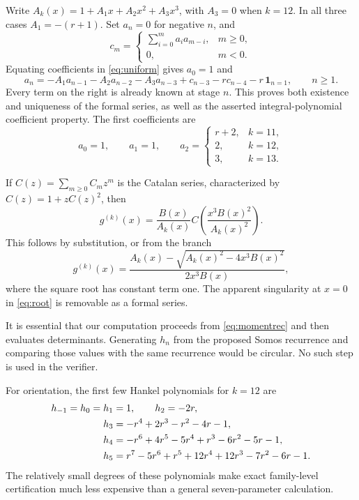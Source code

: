 \documentclass[11pt,letterpaper]{article}
\numberwithin{equation}{section}
\theoremstyle{definition}
\begin{document}
Write \(A_k(x)=1+A_1x+A_2x^2+A_3x^3\), with \(A_3=0\) when \(k=12\).
In all three cases \(A_1=-(r+1)\). Set \(a_n=0\) for negative \(n\), and
\begin{equation}
 c_m=\begin{cases}\displaystyle\sum_{i=0}^m a_i a_{m-i},&m\geq0,\\
                  0,&m<0.
      \end{cases}
\end{equation}
Equating coefficients in \eqref{eq:uniform} gives \(a_0=1\) and
\begin{equation}
 a_n=-A_1a_{n-1}-A_2a_{n-2}-A_3a_{n-3}
      +c_{n-3}-rc_{n-4}-r\,\mathbf1_{n=1},\qquad n\geq1.
 \label{eq:momentrec}
\end{equation}
Every term on the right is already known at stage \(n\). This proves both
existence and uniqueness of the formal series, as well as the asserted
integral-polynomial coefficient property. The first coefficients are
\begin{equation}
 a_0=1,\qquad a_1=1,\qquad
 a_2=\begin{cases}r+2,&k=11,\\2,&k=12,\\3,&k=13.\end{cases}
 \label{eq:firstmoments}
\end{equation}

If \(C(z)=\sum_{m\geq0}C_mz^m\) is the Catalan series, characterized by
\(C(z)=1+zC(z)^2\), then
\begin{equation}
 g^{(k)}(x)=\frac{B(x)}{A_k(x)}
 C\!\left(\frac{x^3B(x)^2}{A_k(x)^2}\right).
 \label{eq:catalan}
\end{equation}
This follows by substitution, or from the branch
\begin{equation}
 g^{(k)}(x)=\frac{A_k(x)-\sqrt{A_k(x)^2-4x^3B(x)^2}}{2x^3B(x)},
 \label{eq:root}
\end{equation}
where the square root has constant term one. The apparent singularity at
\(x=0\) in \eqref{eq:root} is removable as a formal series.

It is essential that our computation proceeds from \eqref{eq:momentrec}
and then evaluates determinants. Generating \(h_n\) from the proposed
Somos recurrence and comparing those values with the same recurrence
would be circular. No such step is used in the verifier.

For orientation, the first few Hankel polynomials for \(k=12\) are
\begin{align}
 h_{-1}=h_0=h_1&=1,\qquad h_2=-2r,\notag\\
 h_3&=-r^4+2r^3-r^2-4r-1,\notag\\
 h_4&=-r^6+4r^5-5r^4+r^3-6r^2-5r-1,\notag\\
 h_5&=r^7-5r^6+r^5+12r^4+12r^3-7r^2-6r-1.
 \label{eq:initialpolys}
\end{align}
The relatively small degrees of these polynomials make exact family-level
certification much less expensive than a general seven-parameter calculation.
\end{document}
